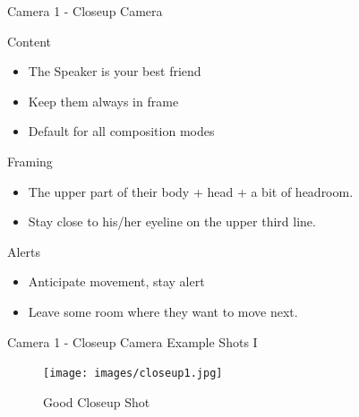 \documentclass[aspectratio=169]{beamer}
\begin{document}


\begin{frame}{Camera 1 - Closeup Camera}
		\begin{block}{Content}
			\begin{itemize}
				\item The Speaker is your best friend
				\item Keep them always in frame
				\item Default for all composition modes
			\end{itemize}
		\end{block}
		
		\begin{block}{Framing}
			\begin{itemize}
				\item The upper part of their body + head + a bit of headroom.
				\item Stay close to his/her eyeline on the upper third line.
			\end{itemize}
		\end{block}

		\begin{alertblock}{Alerts}
			\begin{itemize}
				\item Anticipate movement, stay alert
				\item Leave some room where they want to move next.
			\end{itemize}
		\end{alertblock}
\end{frame}

\begin{frame}{Camera 1 - Closeup Camera}
	Example Shots I
	\begin{figure} 
		\centering
		\texttt{[image: images/closeup1.jpg]}
		\caption{Good Closeup Shot}
	\end{figure}
\end{frame}
\end{document}
